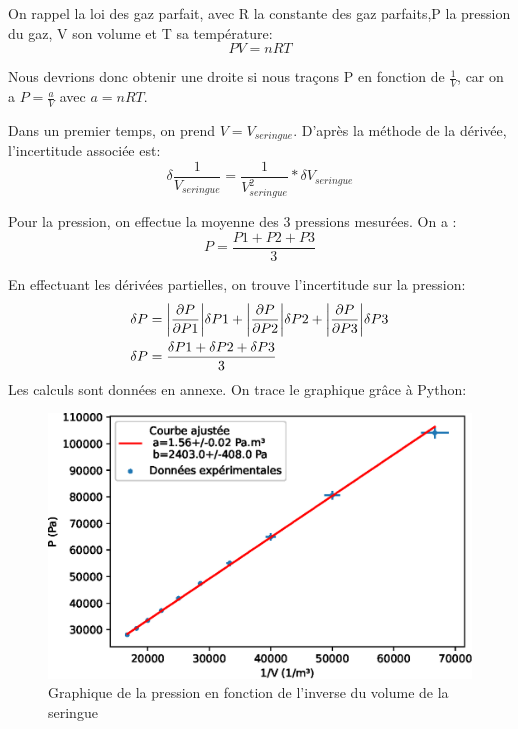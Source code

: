 \documentclass[12pt]{article}
\begin{document}
On rappel la loi des gaz parfait, avec R la constante des gaz parfaits,P la pression du gaz, V son volume et T sa température:
\begin{equation}
PV=nRT
\end{equation}

Nous devrions donc obtenir une droite si nous traçons P en fonction de $\frac{1}{V}$, car on a $P=\frac{a}{V}$ avec $a=nRT$.  

Dans un premier temps, on prend $V=V_{seringue}$. D'après la méthode de la dérivée, l'incertitude associée est:
\begin{equation}
\delta \frac{1}{V_{seringue}}=\frac{1}{V_{seringue}^2}*\delta V_{seringue}
\end{equation}

Pour la pression, on effectue la moyenne des 3 pressions mesurées. On a :
\begin{equation}
P=\frac{P1+P2+P3}{3}
\end{equation}

En effectuant les dérivées partielles, on trouve l'incertitude sur la pression:
\begin{align*}
\delta P &= \abs{\frac{\partial P}{\partial P1}} \delta P1 +\abs{\frac{\partial P}{\partial P2}} \delta P2 +\abs{\frac{\partial P}{\partial P3}} \delta P3 \\
\delta P &= \frac{\delta P1 +\delta P2 +\delta P3}{3}
\end{align*}
\newpage
Les calculs sont données en annexe. On trace le graphique grâce à Python:
\begin{figure}[h!]
	\begin{center}
		\includegraphics[scale=0.9]{img/GExp1.eps}
		\caption{Graphique de la pression en fonction de l'inverse du volume de la seringue}
	\end{center}
\end{figure}
\end{document}
